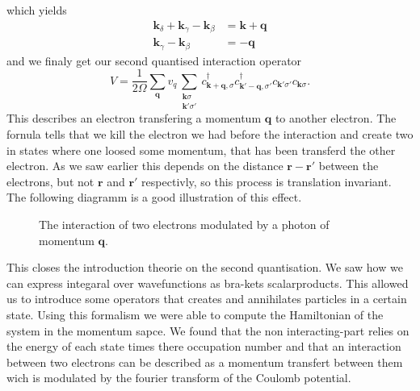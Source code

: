 \documentclass[../main.tex]{subfile}
\begin{document}
which yields
\begin{align*}
    \bm{k}_{\delta} + \bm{k}_{\gamma} - \bm{k}_{\beta} &= \bm{k}+ \bm{q}\\
    \bm{k}_{\gamma} - \bm{k}_{\beta} &=  -\bm{q}
\end{align*}
and we finaly get our second quantised interaction operator
\[
    V = \frac{1}{2\Omega} \sum_{\bm{q}}v_{q} \sum_{\substack{\bm{k}\sigma\\\bm{k}'\sigma'}} c^{\dagger}_{\bm{k}+\bm{q},\sigma}c^{\dagger}_{\bm{k}'-\bm{q},\sigma'}c_{\bm{k}'\sigma'}c_{\bm{k}\sigma}.
\]
This describes an electron transfering a momentum $\bm{q}$ to another electron. The fornula tells that we kill the electron we had before the interaction
and create two in states where one loosed some momentum, that has been transferd the other electron. As we saw earlier this depends on the distance $\bm{r}-\bm{r}'$
between the electrons, but not $\bm{r}$ and $\bm{r}'$ respectivly, so this process is translation invariant. The following diagramm is a good illustration of this effect.\\
\begin{figure}[H]
    \centering
    \label{ref:photon_exchange}
    \caption{The interaction of two electrons modulated by a photon of momentum $\bm{q}$.}
\end{figure}
This closes the introduction theorie on the second quantisation. We saw how we can express integaral over wavefunctions as bra-kets scalarproducts. 
This allowed us to introduce some operators that creates and annihilates particles in a certain state. Using this formalism we were able to compute the 
Hamiltonian of the system in the momentum sapce. We found that the non interacting-part relies on the energy of each state times there occupation number
and that an interaction between two electrons can be described as a momentum transfert between them wich is modulated by the fourier transform of the Coulomb potential.
\end{document}
